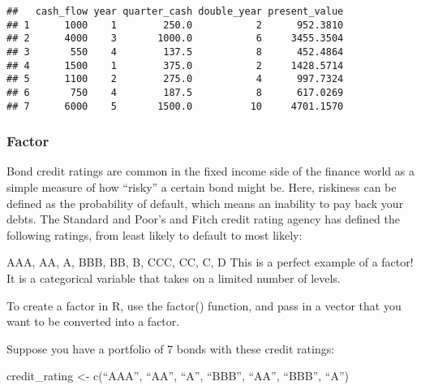 \documentclass[]{article}
\newenvironment{Shaded}{\begin{snugshade}}{\end{snugshade}}
\newcommand{\KeywordTok}[1]{\textcolor[rgb]{0.13,0.29,0.53}{\textbf{#1}}}
\newcommand{\StringTok}[1]{\textcolor[rgb]{0.31,0.60,0.02}{#1}}
\newcommand{\CommentTok}[1]{\textcolor[rgb]{0.56,0.35,0.01}{\textit{#1}}}
\newcommand{\OperatorTok}[1]{\textcolor[rgb]{0.81,0.36,0.00}{\textbf{#1}}}
\newcommand{\NormalTok}[1]{#1}
\begin{document}
\begin{verbatim}
##   cash_flow year quarter_cash double_year present_value
## 1      1000    1        250.0           2      952.3810
## 2      4000    3       1000.0           6     3455.3504
## 3       550    4        137.5           8      452.4864
## 4      1500    1        375.0           2     1428.5714
## 5      1100    2        275.0           4      997.7324
## 6       750    4        187.5           8      617.0269
## 7      6000    5       1500.0          10     4701.1570
\end{verbatim}

\begin{Shaded}
\end{Shaded}

\subsubsection{Factor}\label{factor}

Bond credit ratings are common in the fixed income side of the finance
world as a simple measure of how ``risky'' a certain bond might be.
Here, riskiness can be defined as the probability of default, which
means an inability to pay back your debts. The Standard and Poor's and
Fitch credit rating agency has defined the following ratings, from least
likely to default to most likely:

AAA, AA, A, BBB, BB, B, CCC, CC, C, D This is a perfect example of a
factor! It is a categorical variable that takes on a limited number of
levels.

To create a factor in R, use the factor() function, and pass in a vector
that you want to be converted into a factor.

Suppose you have a portfolio of 7 bonds with these credit ratings:

credit\_rating \textless{}- c(``AAA'', ``AA'', ``A'', ``BBB'', ``AA'',
``BBB'', ``A'')
\end{document}
